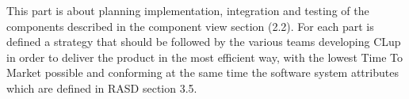 \documentclass[../../main.tex]{subfiles}
\begin{document}
This part is about planning implementation, integration and testing of the components described in the component view section (2.2).
For each part is defined a strategy that should be followed by the various teams developing CLup in order to deliver the product in 
the most efficient way, with the lowest Time To Market possible and conforming at the same time the software system attributes which 
are defined in RASD section 3.5.
\end{document}
